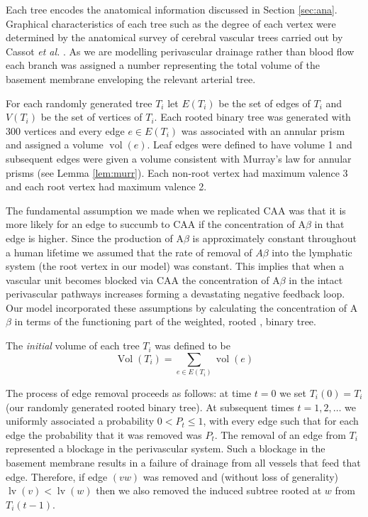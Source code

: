 \documentclass[10pt]{amsart} %
\theoremstyle{definition}
\DeclareMathOperator{\vol}{vol}
\DeclareMathOperator{\Vol}{Vol}
\DeclareMathOperator{\lv}{lv}
\begin{document}
Each tree encodes the anatomical information discussed in Section \ref{sec:ana}. Graphical characteristics of each tree such 
as the degree of each vertex were determined by the anatomical survey of cerebral vascular trees carried out by Cassot 
\emph{et al.} \cite{Cassot}.  As we are modelling perivascular drainage rather than blood flow each branch was 
assigned a number representing the total volume of the basement membrane enveloping the relevant arterial tree.   

For each randomly generated tree $T_i$ let $E(T_i)$ be the set of edges of $T_i$ and $V(T_i)$ be the set of vertices of $T_i$.  Each rooted binary tree was generated with $300$
vertices and every edge $e \in E(T_i)$ was associated with an annular prism 
and assigned a volume $\vol(e)$. Leaf  edges were defined to have volume 1 and subsequent edges
were given a volume 
consistent with Murray's law for annular prisms (see Lemma \ref{lem:murr}).   Each non-root vertex had maximum valence 3 and each root vertex had maximum valence 2.  

The fundamental assumption we made when we replicated CAA was that it is more likely for an edge to succumb to CAA if the concentration of A$\beta$ in that edge is higher.  Since the production
of A$\beta$ is approximately constant throughout a human lifetime \cite{wellerperi} we assumed that the rate of removal of $A\beta$ into the lymphatic system (the root vertex in our model) was
constant. This implies that when a vascular unit becomes blocked via CAA the concentration of A$\beta$ in the intact perivascular pathways increases forming a devastating negative feedback 
loop.  Our model incorporated these assumptions by calculating the concentration of A$\beta$ in terms of the functioning part of the weighted, rooted , binary tree. 
    

The \emph{initial} volume of each tree $T_i$ was defined to be 
\[\Vol(T_i) =  \sum_{e \in E(T_i)} \vol(e)\]
 
The process of edge removal proceeds as follows:  at time $t=0$ we set $T_{i}(0) = T_{i}$ (our randomly generated rooted binary
tree).  At subsequent times  $t = 1,2,\dots$ we uniformly associated a probability $0<P_{t}\leq 1$,
with every edge such that for each edge the probability that it was removed was $P_t$.  The removal of an edge from $T_i$  represented a blockage in the perivascular system.  Such a blockage
in the basement membrane results in a failure of drainage from all vessels that feed 
that edge. Therefore, if edge $(vw)$ was removed and (without loss of generality) $\lv(v) < \lv(w)$ then we also removed the induced subtree rooted at $w$ from
$T_i(t-1)$.     
\end{document}
